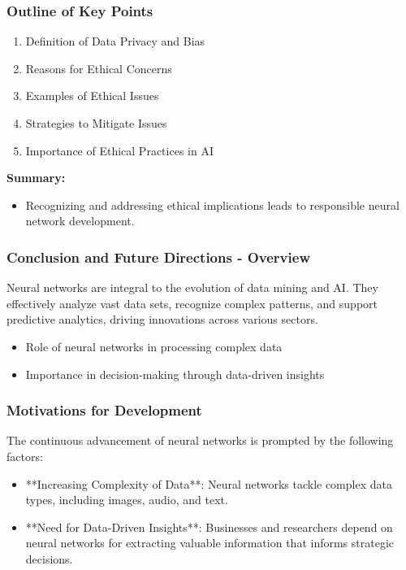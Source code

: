\documentclass[aspectratio=169]{beamer}
\begin{document}
\begin{frame}[fragile]
    \frametitle{Outline of Key Points}
    \begin{enumerate}
        \item Definition of Data Privacy and Bias
        \item Reasons for Ethical Concerns
        \item Examples of Ethical Issues
        \item Strategies to Mitigate Issues
        \item Importance of Ethical Practices in AI 
    \end{enumerate}
    \textbf{Summary:}  
    \begin{itemize}
        \item Recognizing and addressing ethical implications leads to responsible neural network development.
    \end{itemize}
\end{frame}

\begin{frame}[fragile]
    \frametitle{Conclusion and Future Directions - Overview}
    Neural networks are integral to the evolution of data mining and AI. They effectively analyze vast data sets, recognize complex patterns, and support predictive analytics, driving innovations across various sectors.
    
    \begin{itemize}
        \item Role of neural networks in processing complex data
        \item Importance in decision-making through data-driven insights
    \end{itemize}
\end{frame}

\begin{frame}[fragile]
    \frametitle{Motivations for Development}
    The continuous advancement of neural networks is prompted by the following factors:
    
    \begin{itemize}
        \item **Increasing Complexity of Data**: Neural networks tackle complex data types, including images, audio, and text.
        
        \item **Need for Data-Driven Insights**: Businesses and researchers depend on neural networks for extracting valuable information that informs strategic decisions.
    \end{itemize}
\end{frame}
\end{document}
